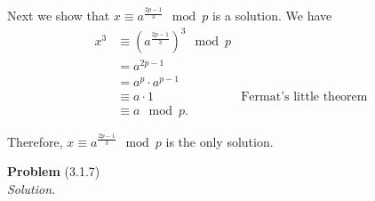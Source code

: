 \documentclass[12 pt]{amsart}
\begin{document}
  Next we show that 
  $x \equiv a^{\frac{2p-1}{3}} \mod p$
  is a solution. 
  We have
  \begin{align*}
    x^3 &\equiv \left( a^{\frac{2p-1}{3}} \right)^3 \mod p \\
        &= a^{2p-1} \\
        &= a^p \cdot a^{p-1} \\
        &\equiv a \cdot 1 &\text{Fermat's little theorem} \\
        &\equiv a \mod p.
  \end{align*}
  
  Therefore, 
  $x \equiv a^{\frac{2p-1}{3}} \mod p$
  is the only solution. 
\vfill
\newpage



\phantom{\quad} \vfill
\noindent
\textbf{Problem} (3.1.7) \\[4ex]
\emph{Solution.} \\[2ex]
\end{document}
